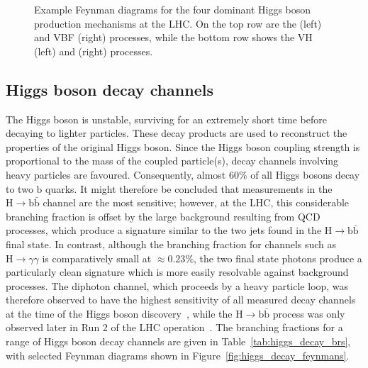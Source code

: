 \begin{figure}
\begin{subfigure}[htbp!]{0.475\textwidth}
        \end{subfigure}\hfill%
    \caption[Example Feynman diagrams for Higgs boson production at the LHC.]{Example Feynman diagrams for the four dominant Higgs boson production mechanisms at the LHC. On the top row are the \ggH (left) and VBF (right) processes, while the bottom row shows the VH (left) and \ttH (right) processes.}
    \label{fig:higgs_prod_feynmans}
\end{figure}

\subsection{Higgs boson decay channels}

The Higgs boson is unstable, surviving for an extremely short time before decaying to lighter particles. These decay products are used to reconstruct the properties of the original Higgs boson. Since the Higgs boson coupling strength is proportional to the mass of the coupled particle(s), decay channels involving heavy particles are favoured. Consequently, almost 60\% of all Higgs bosons decay to two $\mathrm{b}$ quarks. It might therefore be concluded that measurements in the $\mathrm{H}\rightarrow\mathrm{b}\bar{\mathrm{b}}$ channel are the most sensitive; however, at the LHC, this considerable branching fraction is offset by the large background resulting from QCD processes, which produce a signature similar to the two jets found in the $\mathrm{H}\rightarrow\mathrm{b}\bar{\mathrm{b}}$ final state. In contrast, although the branching fraction for channels such as $\mathrm{H}\rightarrow\gamma\gamma$ is comparatively small at ${\approx}0.23\%$, the two final state photons produce a particularly clean signature which is more easily resolvable against background processes. The diphoton channel, which proceeds by a heavy particle loop, was therefore observed to have the highest sensitivity of all measured decay channels at the time of the Higgs boson discovery~\cite{Aad:2012tfa,Chatrchyan:2012xdj,Chatrchyan:2013lba}, while the $\mathrm{H}\rightarrow\mathrm{b}\bar{\mathrm{b}}$ process was only observed later in Run 2 of the LHC operation~\cite{CMSHbb,ATLASHbb}. The branching fractions for a range of Higgs boson decay channels are given in Table~\ref{tab:higgs_decay_brs}, with selected Feynman diagrams shown in Figure~\ref{fig:higgs_decay_feynmans}.

